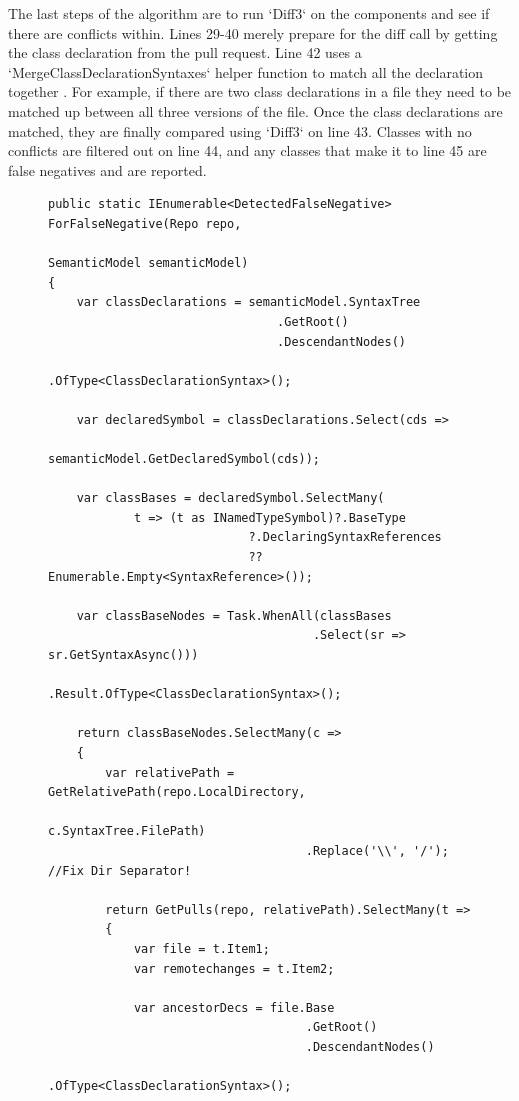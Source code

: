 \documentclass[draftclsnofoot,onecolumn]{IEEEtran}
\begin{document}
The last steps of the algorithm are to run `Diff3` on the components and see if 
there are conflicts within. Lines 29-40 merely prepare for the diff call by 
getting the class declaration from the pull request. Line 42 uses a 
`MergeClassDeclarationSyntaxes` helper function to match all the declaration 
together . For example, if there are two class declarations in a file they need 
to be matched up between all three versions of the file. Once the class 
declarations are matched, they are finally compared using `Diff3` on line 43. 
Classes with no conflicts are filtered out on line 44, and any classes that 
make it to line 45 are false negatives and are reported.

\begin{figure}[!htb]
\centering
\begin{lstlisting}
public static IEnumerable<DetectedFalseNegative> ForFalseNegative(Repo repo,
                                                   SemanticModel semanticModel)
{
    var classDeclarations = semanticModel.SyntaxTree
                                .GetRoot()
                                .DescendantNodes()
                                .OfType<ClassDeclarationSyntax>();

    var declaredSymbol = classDeclarations.Select(cds => 
	                                     semanticModel.GetDeclaredSymbol(cds));

    var classBases = declaredSymbol.SelectMany(
            t => (t as INamedTypeSymbol)?.BaseType
                            ?.DeclaringSyntaxReferences 
							?? Enumerable.Empty<SyntaxReference>());

    var classBaseNodes = Task.WhenAll(classBases
	                                 .Select(sr => sr.GetSyntaxAsync()))
                           .Result.OfType<ClassDeclarationSyntax>();

    return classBaseNodes.SelectMany(c =>
    {
        var relativePath = GetRelativePath(repo.LocalDirectory, 
		                                                 c.SyntaxTree.FilePath)
                                    .Replace('\\', '/'); //Fix Dir Separator!

        return GetPulls(repo, relativePath).SelectMany(t =>
        {
            var file = t.Item1;
            var remotechanges = t.Item2;

            var ancestorDecs = file.Base
                                    .GetRoot()
                                    .DescendantNodes()
                                    .OfType<ClassDeclarationSyntax>();


\end{lstlisting}
\end{figure}
\end{document}
